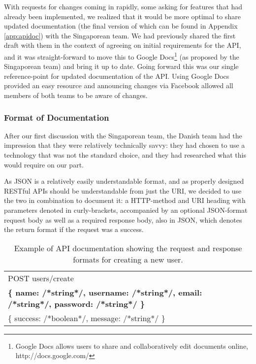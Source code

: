 With requests for changes coming in rapidly, some asking for features that had already been implemented, we
realized that it would be more optimal to share updated documentation (the final version of which can be found in
Appendix \ref{app:apidoc}) with the Singaporean team. We had previously
shared the first draft with them in the context of agreeing on initial requirements for the API, and it was
straight-forward to move this to Google Docs\footnote{Google Docs allows users to share and collaboratively edit
documents online, http://docs.google.com/} (as proposed by the Singaporean team) and bring it up to date. Going
forward this was our single reference-point for updated documentation of the API. Using Google Docs provided an easy
resource and announcing changes via Facebook allowed all members of both teams to be aware of changes.

\subsubsection{Format of Documentation}

After our first discussion with the Singaporean team, the Danish team had the impression that they were
relatively technically savvy: they had chosen to use a technology that was not the standard choice, and
they had researched what this would require on our part.

As JSON is a relatively easily understandable format, and as properly designed RESTful APIs should be
understandable from just the URI, we decided to use the two in combination to document it: a HTTP-method
and URI heading with parameters denoted in curly-brackets, accompanied by an optional JSON-format request
body as well as a required response body, also in JSON, which denotes the return format if the request was
a success.

\begin{table}[hbt]
    \begin{tabular}{ | l | }
        \hline
        POST users/create \\
        \textbf{\{ name: /*string*/, username: /*string*/, email: /*string*/, password: /*string*/ \}} \\
        \{ success: /*boolean*/, message: /*string*/ \} \\
        \hline
    \end{tabular}
    \caption{Example of API documentation showing the request and response formats for creating a new user.}
\end{table}

